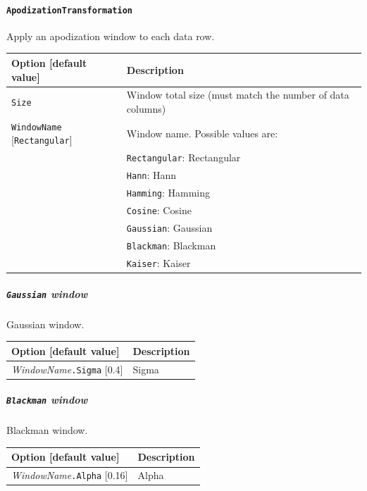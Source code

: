 \documentclass[a4paper,11pt,oneside]{article}
\begin{document}
\paragraph{\texorpdfstring{%
\lstinline[basicstyle=\ttfamily\bfseries]!ApodizationTransformation!}
{ApodizationTransformation}}
Apply an apodization window to each data row.

\begin{center}
 \begin{tabular}{| p{5cm} | p{10cm} | }
 \hline
 Option [default value] & Description\\
 \hline\hline
  \cellcolor{requiredcolor}
  \lstinline!Size! & Window total size (must match the number of data
  columns) \\
  \lstinline!WindowName! [\lstinline!Rectangular!] & Window name.
  Possible values are: \\
   & \lstinline!Rectangular!: Rectangular \\
   & \lstinline!Hann!: Hann \\
   & \lstinline!Hamming!: Hamming \\
   & \lstinline!Cosine!: Cosine \\
   & \lstinline!Gaussian!: Gaussian \\
   & \lstinline!Blackman!: Blackman \\
   & \lstinline!Kaiser!: Kaiser \\
 \hline
\end{tabular}
\end{center}


\subparagraph{\texorpdfstring{%
\lstinline[basicstyle=\ttfamily\bfseries]!Gaussian! window}{Gaussian window}}
Gaussian window.

\begin{center}
 \begin{tabular}{| m{4cm} | m{7cm} | }
 \hline
 Option [default value] & Description\\
 \hline\hline
  \emph{WindowName}\lstinline!.Sigma! [0.4] & Sigma\\
 \hline
\end{tabular}
\end{center}


\subparagraph{\texorpdfstring{%
\lstinline[basicstyle=\ttfamily\bfseries]!Blackman! window}{Blackman window}}
Blackman window.

\begin{center}
 \begin{tabular}{| m{4cm} | m{7cm} | }
 \hline
 Option [default value] & Description\\
 \hline\hline
  \emph{WindowName}\lstinline!.Alpha! [0.16] & Alpha\\
 \hline
\end{tabular}
\end{center}
\end{document}
